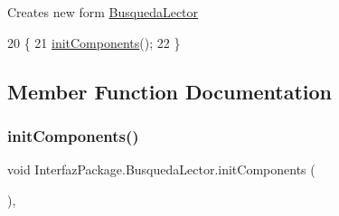 Creates new form \mbox{\hyperlink{class_interfaz_package_1_1_busqueda_lector}{Busqueda\+Lector}} 
\begin{DoxyCode}
20                             \{
21         \mbox{\hyperlink{class_interfaz_package_1_1_busqueda_lector_aed51740a2e167797bac39332221f591c}{initComponents}}();
22     \}
\end{DoxyCode}


\subsection{Member Function Documentation}
\mbox{\label{class_interfaz_package_1_1_busqueda_lector_aed51740a2e167797bac39332221f591c}} 
\subsubsection{\texorpdfstring{init\+Components()}{initComponents()}}
{\footnotesize\ttfamily void Interfaz\+Package.\+Busqueda\+Lector.\+init\+Components (\begin{DoxyParamCaption}{ }\end{DoxyParamCaption})\hspace{0.3cm}{\ttfamily [inline]}, {\ttfamily [private]}}

